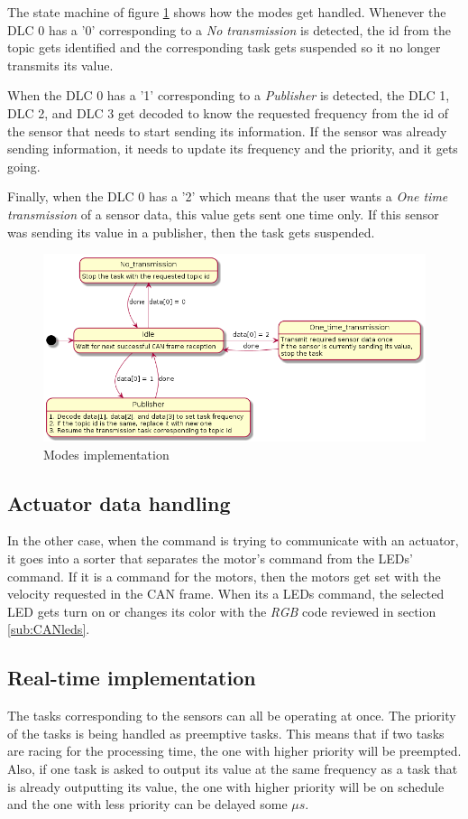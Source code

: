 \documentclass[12pt]{report}%
\begin{document}
The state machine of figure \ref{fig:states} shows how the modes get handled. Whenever the DLC 0 has a '0' corresponding to a \textit{No transmission} is detected, the id from the topic gets identified and the corresponding task gets suspended so it no longer transmits its value.

When the DLC 0 has a '1' corresponding to a \textit{Publisher} is detected, the DLC 1, DLC 2, and DLC 3 get decoded to know the requested frequency from the id of the sensor that needs to start sending its information. If the sensor was already sending information, it needs to update its frequency and the priority, and it gets going.

Finally, when the DLC 0 has a '2' which means that the user wants a \textit{One time transmission} of a sensor data, this value gets sent one time only. If this sensor was sending its value in a publisher, then the task gets suspended.

\begin{figure}[ht]
 \centering
 \includegraphics[width=\textwidth]{states}
		\caption{Modes implementation}
		\label{fig:states}
\end{figure}

\subsection{Actuator data handling}
In the other case, when the command is trying to communicate with an actuator, it goes into a sorter that separates the motor's command from the LEDs' command. If it is a command for the motors, then the motors get set with the velocity requested in the CAN frame. When its a LEDs command, the selected LED gets turn on or changes its color with the \textit{RGB} code reviewed in section \ref{sub:CANleds}.

\subsection{Real-time implementation}
\label{sub:rtimp}
The tasks corresponding to the sensors can all be operating at once. The priority of the tasks is being handled as preemptive tasks. This means that if two tasks are racing for the processing time, the one with higher priority will be preempted. Also, if one task is asked to output its value at the same frequency as a task that is already outputting its value, the one with higher priority will be on schedule and the one with less priority can be delayed some $\mu s$.
\end{document}
